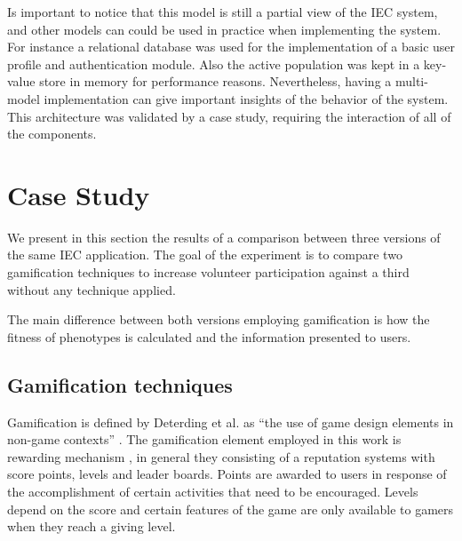 \documentclass[conference]{IEEEtran}
\begin{document}
Is important to notice that this model is still a partial view of the IEC system,
and other models can could be used in practice when implementing the
system. %
%
For instance a relational database was used for the implementation of a 
basic user profile and authentication module. Also the active population 
was kept in a key-value store in memory for performance reasons.  
Nevertheless, having a multi-model implementation can give important 
insights of the behavior of the system. This architecture was validated
by a case study, requiring the interaction of all of the components.        

\section{Case Study}
\label{sec:experiments}

We present in this section the results of a comparison between three versions
of the same IEC application. The goal of the experiment is to compare two 
gamification techniques to increase volunteer participation against a third 
without any technique applied.

The main difference between both versions employing gamification is how the fitness of phenotypes
is calculated and the information presented to users. 

\subsection{Gamification techniques}
\label{sec:gamification}

Gamification is defined by Deterding et al. as
``the use of game design elements in non-game contexts'' \cite{deterding2011game}.
The gamification element employed in this work is rewarding mechanism 
\cite{dubois2013understanding}, in general they consisting of a reputation systems with score points, 
levels and leader boards. Points are awarded to users in response of
the accomplishment of certain activities that need to be encouraged. Levels depend
on the score and certain features of the game are only available to gamers when 
they reach a giving level.
\end{document}
